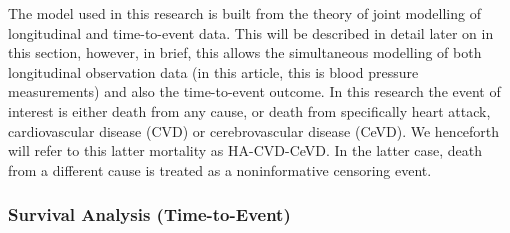 \documentclass[
]{article}
\begin{document}
The model used in this research is built from the theory of joint modelling of longitudinal and time-to-event data. This will be described in detail later on in this section, however, in brief, this allows the simultaneous modelling of both longitudinal observation data (in this article, this is blood pressure measurements) and also the time-to-event outcome.
In this research the event of interest is either death from any cause, or death from specifically heart attack, cardiovascular disease (CVD) or cerebrovascular disease (CeVD). We henceforth will refer to this latter mortality as HA-CVD-CeVD.
In the latter case, death from a different cause is treated as a noninformative censoring event.

\hypertarget{survival-analysis-time-to-event}{%
\subsubsection{Survival Analysis (Time-to-Event)}\label{survival-analysis-time-to-event}}
\end{document}
